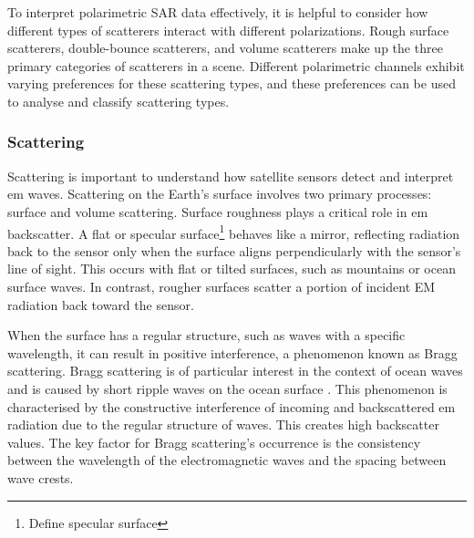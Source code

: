 To interpret polarimetric SAR data effectively, it is helpful to consider how different types of scatterers interact with different polarizations. Rough surface scatterers, double-bounce scatterers, and volume scatterers make up the three primary categories of scatterers in a scene. Different polarimetric channels exhibit varying preferences for these scattering types, and these preferences can be used to analyse and classify scattering types. 


\subsubsection{Scattering}

Scattering is important to understand how satellite sensors detect and interpret \acs{em} waves. Scattering on the Earth's surface involves two primary processes: surface and volume scattering. Surface roughness plays a critical role in \acs{em} backscatter. A flat or specular surface\footnote{Define specular surface} behaves like a mirror, reflecting radiation back to the sensor only when the surface aligns perpendicularly with the sensor's line of sight. This occurs with flat or tilted surfaces, such as mountains or ocean surface waves. In contrast, rougher surfaces scatter a portion of incident EM radiation back toward the sensor. 

When the surface has a regular structure, such as waves with a specific wavelength, it can result in positive interference, a phenomenon known as Bragg scattering. Bragg scattering is of particular interest in the context of ocean waves and is caused by short ripple waves on the ocean surface \cite{Hasselmann1991}. This phenomenon is characterised by the constructive interference of incoming and backscattered \acs{em} radiation due to the regular structure of waves. This creates high backscatter values. The key factor for Bragg scattering's occurrence is the consistency between the wavelength of the electromagnetic waves and the spacing between wave crests.





